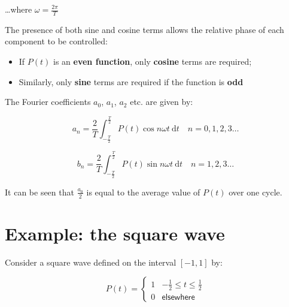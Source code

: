 \documentclass[
]{book}
\providecommand{\tightlist}{%
  \setlength{\itemsep}{0pt}\setlength{\parskip}{0pt}}
\begin{document}
\ldots where \(\omega = \frac{2\pi}{T}\)

The presence of both sine and cosine terms allows the relative phase of each component to be controlled:

\begin{itemize}
\tightlist
\item
  If \(P(t)\) is an \textbf{even function}, only \textbf{cosine} terms are required;
\item
  Similarly, only \textbf{sine} terms are required if the function is \textbf{odd}
\end{itemize}

The Fourier coefficients \(a_0\), \(a_1\), \(a_2\) etc. are given by:

\begin{equation}
a_n = \frac{2}{T} \int_{-\frac{T}{2}}^{\frac{T}{2}} P(t) \cos n \omega t ~\mathrm{d}t \quad n = 0,1,2,3 \dots
\end{equation}

\begin{equation}
b_n = \frac{2}{T} \int_{-\frac{T}{2}}^{\frac{T}{2}} P(t) \sin n \omega t ~\mathrm{d}t \quad n = 1,2,3 \dots
\end{equation}

It can be seen that \(\frac{a_0}{2}\) is equal to the average value of \(P(t)\) over one cycle.

\hypertarget{sec-ch11-squarewave}{%
\section{Example: the square wave}\label{sec-ch11-squarewave}}

Consider a square wave defined on the interval \(\left[-1,1 \right]\) by:

\begin{equation}
P(t) = \left\{ \begin{array}{rl} 1 & -\frac{1}{2} \leq t \leq \frac{1}{2} \\ 0 & \textsf{elsewhere} \end{array} \right.
\end{equation}
\end{document}
